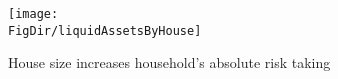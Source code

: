 \begin{figure}[h]
	\centering
	\texttt{[image: \\FigDir/liquidAssetsByHouse]}
	\caption{House size increases household's absolute risk taking}
	\label{fig:liquidAssetsByHouse}
\end{figure}
